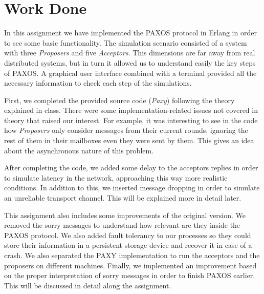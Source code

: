 \section{Work Done}
\label{sec:WorkDone}

In this assignment we have implemented the PAXOS protocol 
in Erlang in order to see some basic functionality. The simulation scenario
consisted of a system with three \emph{Proposers} and five \emph{Acceptors}.
This dimensions are far away from real distributed systems, but in turn it allowed
us to understand easily the key steps of PAXOS. A graphical
user interface combined with a terminal provided all the necessary
information to check each step of the simulations.

First, we completed the provided source code (\emph{Paxy}) following the theory
explained in class. There were some implementation-related issues not covered
in theory that raised our interest. For example, it was interesting to see in the
code how \textit{Proposers} only consider messages from their current rounds, ignoring
the rest of them in their mailboxes even they were sent by them. This gives an idea
about the asynchronous nature of this problem. 

After completing the code, we added some delay to the acceptors replies in order to simulate latency in
the network, approaching this way more realistic conditions. In addition to this, we inserted message
dropping in order to simulate an unreliable transport channel. This will be explained
more in detail later.

This assignment also includes some improvements of the original version. We removed the sorry 
messages to understand how relevant are they inside the PAXOS protocol. We also
added fault tolerancy to our processes so they could store their information in a persistent storage 
device and recover it in case of a crash. We also separated the PAXY implementation to
run the acceptors and the proposers on different machines. Finally, we implemented an improvement based on the proper 
interpretation of sorry messages in order to finish PAXOS earlier. This will be discussed in detail
along the assignment.
